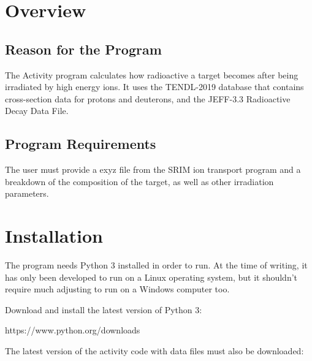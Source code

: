 \documentclass[12pt,twoside]{manual}
\begin{document}


\tableofcontents






\chapter{Overview}

\section{Reason for the Program}

The Activity program calculates how radioactive a target becomes after being irradiated by high energy ions.  It uses the TENDL-2019 database that contains cross-section data for protons and deuterons, and the JEFF-3.3 Radioactive Decay Data File.

\section{Program Requirements}

The user must provide a exyz file from the SRIM ion transport program and a breakdown of the composition of the target, as well as other irradiation parameters.




\chapter{Installation}

The program needs Python 3 installed in order to run.  At the time of writing, it has only been developed to run on a Linux operating system, but it shouldn't require much adjusting to run on a Windows computer too.

Download and install the latest version of Python 3:

https://www.python.org/downloads

The latest version of the activity code with data files must also be downloaded:
\end{document}
